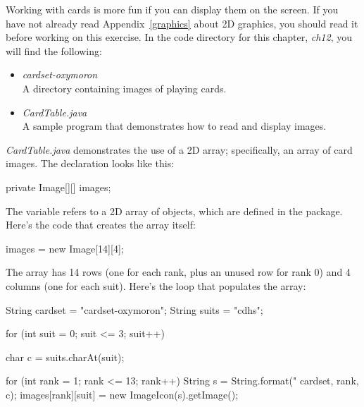 \begin{exercise}  %


Working with cards is more fun if you can display them on the screen.
If you have not already read Appendix~\ref{graphics} about 2D graphics, you should read it before working on this exercise.
In the code directory for this chapter, {\it ch12}, you will find the following:

\begin{itemize}

\item {\it cardset-oxymoron} \\ A directory containing images of playing cards.

\item {\it CardTable.java} \\ A sample program that demonstrates how to read and display images.

\end{itemize}


{\it CardTable.java} demonstrates the use of a 2D array; specifically, an array of card images.
The declaration looks like this:

\begin{code}
private Image[][] images;
\end{code}

The variable  refers to a 2D array of  objects, which are defined in the  package.
Here's the code that creates the array itself:

\begin{code}
images = new Image[14][4];
\end{code}

The array has 14 rows (one for each rank, plus an unused row for rank 0) and 4 columns (one for each suit).
Here's the loop that populates the array:

\begin{code}
String cardset = "cardset-oxymoron";
String suits = "cdhs";

for (int suit = 0; suit <= 3; suit++) {
    char c = suits.charAt(suit);

    for (int rank = 1; rank <= 13; rank++) {
        String s = String.format("%
                                 cardset, rank, c);
        images[rank][suit] = new ImageIcon(s).getImage();
    }
}
\end{code}


\end{exercise}
